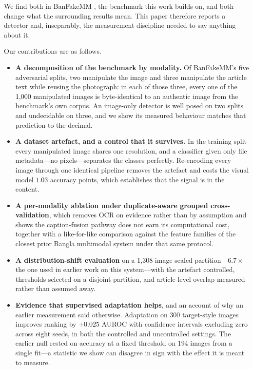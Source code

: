 We find both in BanFakeMM \cite{banfakemm}, the benchmark this work builds on,
and both change what the surrounding results mean. This paper therefore reports
a detector and, inseparably, the measurement discipline needed to say anything
about it.

Our contributions are as follows.

\begin{itemize}
\item \textbf{A decomposition of the benchmark by modality.} Of BanFakeMM's
five adversarial splits, two manipulate the image and three manipulate the
article text while reusing the photograph: in each of those three, every one
of the 1{,}000 manipulated images is byte-identical to an authentic image from
the benchmark's own corpus. An image-only detector is well posed on two splits
and undecidable on three, and we show its measured behaviour matches that
prediction to the decimal.

\item \textbf{A dataset artefact, and a control that it survives.} In the
training split every manipulated image shares one resolution, and a classifier
given only file metadata---no pixels---separates the classes perfectly.
Re-encoding every image through one identical pipeline removes the artefact and
costs the visual model $1.03$ accuracy points, which establishes that the
signal is in the content.

\item \textbf{A per-modality ablation under duplicate-aware grouped
cross-validation}, which removes OCR on evidence rather than by assumption and
shows the caption-fusion pathway does not earn its computational cost, together
with a like-for-like comparison against the feature families of the closest
prior Bangla multimodal system under that same protocol.

\item \textbf{A distribution-shift evaluation} on a 1{,}308-image sealed
partition---$6.7\times$ the one used in earlier work on this system---with the
artefact controlled, thresholds selected on a disjoint partition, and
article-level overlap measured rather than assumed away.

\item \textbf{Evidence that supervised adaptation helps}, and an account of why
an earlier measurement said otherwise. Adaptation on 300 target-style images
improves ranking by $+0.025$ AUROC with confidence intervals excluding zero
across eight seeds, in both the controlled and uncontrolled settings. The
earlier null rested on accuracy at a fixed threshold on 194 images from a
single fit---a statistic we show can disagree in sign with the effect it is
meant to measure.
\end{itemize}

